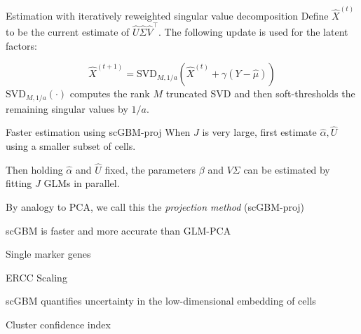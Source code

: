 \documentclass[aspectratio=43]{beamer}
\begin{document}
\begin{frame}{Estimation with iteratively reweighted singular value decomposition}
Define $\hat{X}^{(t)}$ to be the current estimate of $\hat{U} \hat{\Sigma} \hat{V}^{\top}$. The following update is used for the latent factors:

\begin{equation}
\hat{X}^{(t+1)} = \text{SVD}_{M, 1/a} \left( \hat{X}^{(t)} + \gamma( Y - \hat{\mu})     \right) 
\end{equation}
$\text{SVD}_{M, 1/a}(\cdot)$ computes the rank $M$ truncated SVD and then soft-thresholds the remaining singular values by $1/a$. 

\end{frame}

\begin{frame}{Faster estimation using scGBM-proj}
When $J$ is very large, first estimate $\hat{\alpha}, \hat{U}$ using a smaller subset of cells.

\vspace{3em}

Then holding $\hat{\alpha}$ and $\hat{U}$ fixed, the parameters $\beta$ and $V \Sigma$ can be estimated by fitting $J$ GLMs in parallel. 

\vspace{3em}

By analogy to PCA, we call this the \textit{projection method} (scGBM-proj)

\end{frame}

\begin{frame}{scGBM is faster and more accurate than GLM-PCA}

\end{frame}

\begin{frame}{Single marker genes}

\end{frame}

\begin{frame}{ERCC Scaling}

\end{frame}

\begin{frame}{scGBM quantifies uncertainty in the low-dimensional embedding of cells}

\end{frame}

\begin{frame}{Cluster confidence index}

\end{frame}
\end{document}
